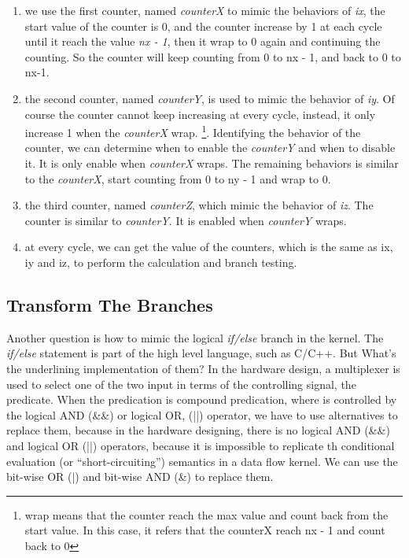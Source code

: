 \begin{enumerate}
  \item we use the first counter, named \emph{counterX} to mimic the
    behaviors of \emph{ix}, the start value of the counter is 0, and the
    counter increase by 1 at each cycle until it reach the value \emph{nx -
    1}, then it wrap to 0 again and continuing the counting. So the counter
    will keep counting from 0 to nx - 1, and back to 0 to nx-1.

  \item the second counter, named \emph{counterY}, is used to mimic the
    behavior of \emph{iy}. Of course the counter cannot keep increasing
    at every cycle, instead, it only increase 1 when the \emph{counterX}
    wrap. \footnote{wrap means that the counter reach the max value and
      count back from the start value. In this case, it refers that the
    counterX reach nx - 1 and count back to 0}. Identifying the behavior
    of the counter, we can determine when to enable the \emph{counterY}
    and when to disable it. It is only enable when \emph{counterX}
    wraps. The remaining behaviors is similar to the \emph{counterX},
    start counting from 0 to ny - 1 and wrap to 0.

  \item the third counter, named \emph{counterZ}, which mimic the behavior
    of \emph{iz}. The counter is similar to \emph{counterY}. It is enabled
    when \emph{counterY} wraps.

    \item at every cycle, we can get the value of the counters, which is the
      same as ix, iy and iz, to perform the calculation and branch testing.

\end{enumerate}


\subsection{Transform The Branches} %
\label{ssub:Transform The Br}
Another question is how to mimic the logical \emph{if/else} branch in the
kernel. The \emph{if/else} statement is part of the high level language,
such as C/C++. But What's the underlining implementation of them? In the
hardware design, a multiplexer is used to select one of the two input in
terms of the controlling signal, the predicate. When  the predication
is compound predication, where is controlled by the logical AND (\&\&) or
logical OR, (||) operator, we have to use alternatives to replace them,
because in the hardware designing, there is no logical AND (\&\&) and
logical OR (||)
operators, because it is impossible to replicate th conditional evaluation
(or ``short-circuiting'') semantics in a data flow kernel. We can use the
bit-wise OR (|) and bit-wise AND (\&) to replace them.

